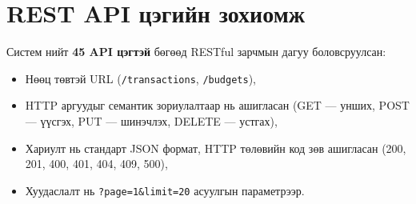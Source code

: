 \section{REST API цэгийн зохиомж}
Систем нийт \textbf{45 API цэгтэй} бөгөөд RESTful зарчмын \cite{rest} дагуу боловсруулсан:
\begin{itemize}
    \item Нөөц төвтэй URL (\texttt{/transactions}, \texttt{/budgets}),
    \item HTTP аргуудыг семантик зориулалтаар нь ашигласан (GET --- унших, POST --- үүсгэх, PUT --- шинэчлэх, DELETE --- устгах),
    \item Хариулт нь стандарт JSON формат, HTTP төлөвийн код зөв ашигласан (200, 201, 400, 401, 404, 409, 500),
    \item Хуудаслалт нь \texttt{?page=1\&limit=20} асуулгын параметрээр.
\end{itemize}


